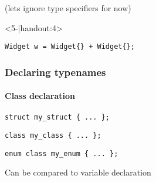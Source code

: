 \documentclass[14pt,a4paper,dvipsnames,usenames]{beamer}
\begin{document}
\begin{frame}[fragile]
\begin{onlyenv}
    \vspace{1cm}
    {\fontsize{10pt}{10pt}\selectfont{}(lets ignore type specifiers for now)}
    
  \end{onlyenv}

  \begin{onlyenv}<5-|handout:4>
  \begin{center}
      \begin{lstlisting}[basicstyle=\ttfamily]
  Widget w = Widget{} + Widget{};
      \end{lstlisting}
  \end{center}

  \end{onlyenv}

  
\end{frame}

\begin{frame}[fragile]
  \frametitle{Declaring typenames}
  \framesubtitle{Class declaration}

  \begin{lstlisting}[basicstyle=\ttfamily]
struct my_struct { ... };
  \end{lstlisting}

  \vspace{.5cm}
  \begin{lstlisting}[basicstyle=\ttfamily]
class my_class { ... };
  \end{lstlisting}

  \vspace{.5cm}
  \begin{lstlisting}[basicstyle=\ttfamily]
enum class my_enum { ... };
  \end{lstlisting}

  \vspace{.75cm}
  Can be compared to variable declaration
  
\end{frame}
\end{document}
